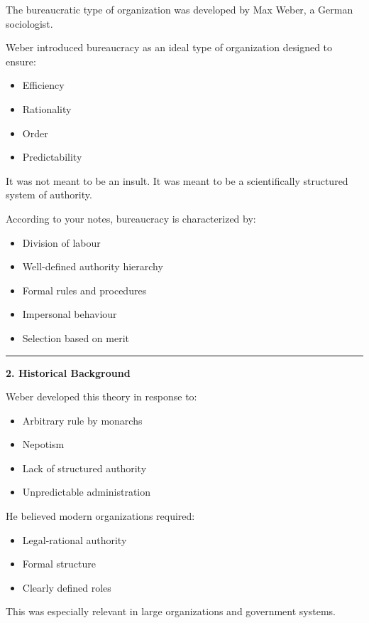 \documentclass[10pt,a4paper]{article}
\newcommand{\separator}{\vspace{0.4em}\noindent\rule{\linewidth}{0.6pt}\vspace{0.4em}}
\begin{document}
The bureaucratic type of organization was developed by Max Weber, a German sociologist.

Weber introduced bureaucracy as an ideal type of organization designed to ensure:

\begin{itemize}
  \item Efficiency
  \item Rationality
  \item Order
  \item Predictability
\end{itemize}

It was not meant to be an insult. It was meant to be a scientifically structured system of
authority.

According to your notes, bureaucracy is characterized by:

\begin{itemize}
  \item Division of labour
  \item Well-defined authority hierarchy
  \item Formal rules and procedures
  \item Impersonal behaviour
  \item Selection based on merit
\end{itemize}

\separator

\textbf{2. Historical Background}

Weber developed this theory in response to:

\begin{itemize}
  \item Arbitrary rule by monarchs
  \item Nepotism
  \item Lack of structured authority
  \item Unpredictable administration
\end{itemize}

He believed modern organizations required:

\begin{itemize}
  \item Legal-rational authority
  \item Formal structure
  \item Clearly defined roles
\end{itemize}

This was especially relevant in large organizations and government systems.
\end{document}
